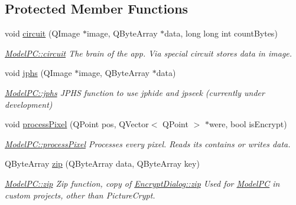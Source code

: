 \subsection*{Protected Member Functions}
\begin{DoxyCompactItemize}
\item 
void \mbox{\hyperlink{class_model_p_c_a1d0091062a0c836b283ec2f67411623b}{circuit}} (Q\+Image $\ast$image, Q\+Byte\+Array $\ast$data, long long int count\+Bytes)
\begin{DoxyCompactList}\small\item\em \mbox{\hyperlink{class_model_p_c_a1d0091062a0c836b283ec2f67411623b}{Model\+P\+C\+::circuit}} The brain of the app. Via special circuit stores data in image. \end{DoxyCompactList}\item 
void \mbox{\hyperlink{class_model_p_c_a8bee0255c09449868c7e6097afaaf0cd}{jphs}} (Q\+Image $\ast$image, Q\+Byte\+Array $\ast$data)
\begin{DoxyCompactList}\small\item\em \mbox{\hyperlink{class_model_p_c_a8bee0255c09449868c7e6097afaaf0cd}{Model\+P\+C\+::jphs}} J\+P\+HS function to use jphide and jpseek (currently under development) \end{DoxyCompactList}\item 
void \mbox{\hyperlink{class_model_p_c_a1171f9fe1550133dc9053a46b4e5bcfd}{process\+Pixel}} (Q\+Point pos, Q\+Vector$<$ Q\+Point $>$ $\ast$were, bool is\+Encrypt)
\begin{DoxyCompactList}\small\item\em \mbox{\hyperlink{class_model_p_c_a1171f9fe1550133dc9053a46b4e5bcfd}{Model\+P\+C\+::process\+Pixel}} Processes every pixel. Reads its contains or writes data. \end{DoxyCompactList}\item 
Q\+Byte\+Array \mbox{\hyperlink{class_model_p_c_afebbbfa4b07deba4f68fc6dfb50f353f}{zip}} (Q\+Byte\+Array data, Q\+Byte\+Array key)
\begin{DoxyCompactList}\small\item\em \mbox{\hyperlink{class_model_p_c_afebbbfa4b07deba4f68fc6dfb50f353f}{Model\+P\+C\+::zip}} Zip function, copy of \mbox{\hyperlink{class_encrypt_dialog_a2bff820a3df4ddc36ecb07ed74b7138a}{Encrypt\+Dialog\+::zip}} Used for \mbox{\hyperlink{class_model_p_c}{Model\+PC}} in custom projects, other than Picture\+Crypt. \end{DoxyCompactList}\end{DoxyCompactItemize}



